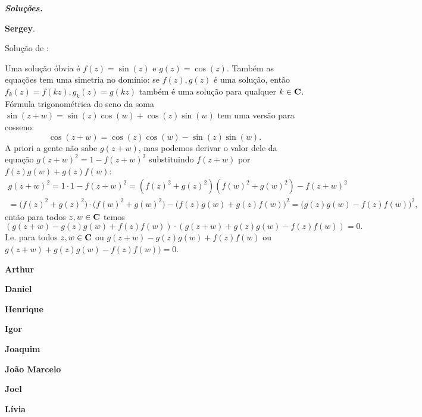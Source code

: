 \bigskip
\emph{\textbf{Soluções.}}

\smallskip
\textbf{Sergey}.

Solução de :

Uma solução óbvia é $f(z) = \sin(z)$ e $g(z) =\cos(z)$.
Também as equações tem uma simetria no domínio:
se $f(z),g(z)$ é uma solução, então $f_k(z) = f(kz), g_k(z) = g(kz)$
também é uma solução para qualquer $k\in\mathbf{C}$.
Fórmula trigonométrica do seno da soma
$\sin(z+w) = \sin(z) \cos(w) + \cos(z) \sin(w)$
tem uma versão para cosseno:
\[ \cos(z+w) = \cos(z)\cos(w) - \sin(z)\sin(w). \]
A priori a gente não sabe $g(z+w)$, mas podemos derivar o valor dele
da equação $g(z+w)^2 = 1 - f(z+w)^2$ substituindo $f(z+w)$
por $f(z)g(w)+g(z)f(w)$:
\begin{multline}
g(z+w)^2 = 1\cdot 1 - f(z+w)^2 = (f(z)^2+g(z)^2)(f(w)^2+g(w)^2) - f(z+w)^2
\\ = \big(f(z)^2+g(z)^2\big)\cdot\big(f(w)^2+g(w)^2\big) - \big(f(z)g(w)+g(z)f(w)\big)^2
   = \big(g(z)g(w)-f(z)f(w)\big)^2,
\end{multline}
então para todos $z,w\in\mathbf{C}$ temos
\[ (g(z+w)-g(z)g(w)+f(z)f(w)) \cdot (g(z+w) + g(z)g(w)-f(z)f(w)) = 0. \]
I.e. para todos $z,w\in\mathbf{C}$ ou
$g(z+w)-g(z)g(w)+f(z)f(w)$ ou $g(z+w) + g(z)g(w)-f(z)f(w)) = 0$.

\medskip
\textbf{Arthur}

\medskip
\textbf{Daniel}

\medskip
\textbf{Henrique}

\medskip
\textbf{Igor}

\medskip
\textbf{Joaquim}

\medskip
\textbf{João Marcelo}

\medskip
\textbf{Joel}

\medskip
\textbf{Lívia}
